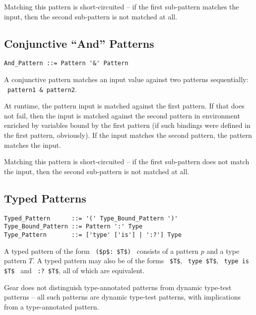 Matching this pattern is short-circuited -- if the first sub-pattern matches the input, then the second sub-pattern is not matched at all. 





\subsection{Conjunctive ``And'' Patterns}
\label{sec:conjunctive-patterns}

\syntax\begin{lstlisting}
And_Pattern ::= Pattern '&' Pattern
\end{lstlisting}

A conjunctive pattern matches an input value against two patterns sequentially: ~\lstinline!pattern1 & pattern2!. 

At runtime, the pattern input is matched against the first pattern. If that does not fail, then the input is matched against the second pattern in environment enriched by variables bound by the first pattern (if such bindings were defined in the first pattern, obviously). If the input matches the second pattern, the pattern matches the input. 

Matching this pattern is short-circuited -- if the first sub-pattern does not match the input, then the second sub-pattern is not matched at all. 






\subsection{Typed Patterns}
\label{sec:typed-patterns}

\syntax\begin{lstlisting}
Typed_Pattern      ::= '(' Type_Bound_Pattern ')'
Type_Bound_Pattern ::= Pattern ':' Type
Type_Pattern       ::= ['type' ['is'] | ':?'] Type
\end{lstlisting}

A typed pattern of the form ~\lstinline!($p$: $T$)!~ consists of a pattern $p$ and a type pattern $T$. A typed pattern may also be of the forms ~\lstinline!$T$!, ~\lstinline!type $T$!, ~\lstinline!type is $T$!~ and
~\lstinline!:? $T$!, all of which are equivalent. 

Gear does not distinguish type-annotated patterns from dynamic type-test patterns -- all such patterns are dynamic type-test patterns, with implications from a type-annotated pattern. 

